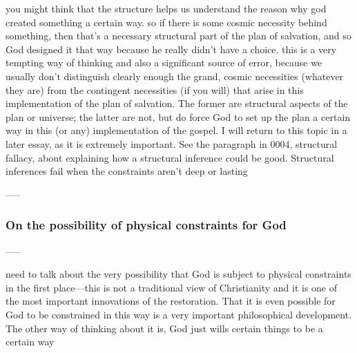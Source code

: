 		you might think that the structure helps us understand the reason why god created something a certain way.
			so if there is some cosmic necessity behind something, then that's a necessary structural part of the plan of salvation, and so God designed it that way because he really didn't have a choice.
			this is a very tempting way of thinking and also a significant source of error, because we usually don't distinguish clearly enough the grand, cosmic necessities (whatever they are) from the contingent necessities (if you will) that arise in this implementation of the plan of salvation. The former are structural aspects of the plan or universe; the latter are not, but do force God to set up the plan a certain way in this (or any) implementation of the gospel.
			I will return to this topic in a later essay, as it is extremely important.
			See the paragraph in 0004, structural fallacy, about explaining how a structural inference could be good.
			Structural inferences fail when the constraints aren't deep or lasting
	
	-----
	\subsubsection{On the possibility of physical constraints for God}
	-----
	
		need to talk about the very possibility that God is subject to physical constraints in the first place---this is not a traditional view of Christianity and it is one of the most important innovations of the restoration.
			That it is even possible for God to be constrained in this way is a very important philosophical development.
			The other way of thinking about it is, God just wills certain things to be a certain way